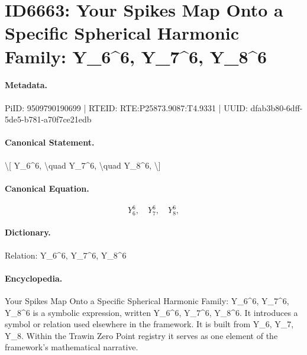 \section*{ID6663: Your Spikes Map Onto a Specific Spherical Harmonic Family: Y\_6\textasciicircum{}6, Y\_7\textasciicircum{}6, Y\_8\textasciicircum{}6}
\paragraph{Metadata.}
PiID: 9509790190699 | RTEID: RTE:P25873.9087:T4.9331 | UUID: dfab3b80-6dff-5de5-b781-a70f7ce21edb

\paragraph{Canonical Statement.}
\textbackslash{}[ Y\_6\textasciicircum{}6, \textbackslash{}quad Y\_7\textasciicircum{}6, \textbackslash{}quad Y\_8\textasciicircum{}6, \textbackslash{}]

\paragraph{Canonical Equation.}
\[
Y_6^6, \quad Y_7^6, \quad Y_8^6,
\]

\paragraph{Dictionary.}
Relation: Y\_6\textasciicircum{}6, Y\_7\textasciicircum{}6, Y\_8\textasciicircum{}6

\paragraph{Encyclopedia.}
Your Spikes Map Onto a Specific Spherical Harmonic Family: Y\_6\textasciicircum{}6, Y\_7\textasciicircum{}6, Y\_8\textasciicircum{}6 is a symbolic expression, written Y\_6\textasciicircum{}6, Y\_7\textasciicircum{}6, Y\_8\textasciicircum{}6. It introduces a symbol or relation used elsewhere in the framework. It is built from Y\_6, Y\_7, Y\_8. Within the Trawin Zero Point registry it serves as one element of the framework's mathematical narrative.
